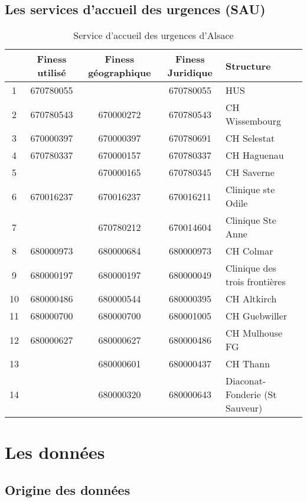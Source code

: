 \documentclass[12pt,english,french]{report}
\begin{document}
\section{Les services d'accueil des urgences (SAU)}

\begin{table}
\begin{center}
\begin{tabular}{|c|c|c|c|l|}
  \hline
& Finess utilisé & Finess géographique & Finess Juridique & Structure \\
  \hline
  \hline
1 & 670780055 &   & 670780055 & HUS \\
2 & 670780543 & 670000272 & 670780543 & CH Wissembourg \\
3 & 670000397 & 670000397  & 670780691 & CH Selestat \\
4 & 670780337 & 670000157 & 670780337 & CH Haguenau \\
5 &   & 670000165 & 670780345 & CH Saverne \\
6 & 670016237  & 670016237  & 670016211 & Clinique ste Odile \\
7 &   & 670780212 & 670014604 & Clinique Ste Anne \\
8 & 680000973 & 680000684 & 680000973 & CH Colmar \\
9 & 680000197  & 680000197  & 680000049 & Clinique des trois frontières \\
10 & 680000486 & 680000544  & 680000395 & CH Altkirch \\
11 & 680000700 & 680000700 & 680001005 & CH Guebwiller \\
12 & 680000627 & 680000627 & 680000486 & CH Mulhouse FG \\
13 &   & 680000601 & 680000437 & CH Thann \\
14 &   & 680000320  & 680000643 & Diaconat-Fonderie (St Sauveur) \\
\hline
\end{tabular}
\caption{Service d'accueil des urgences d'Alsace}
\label{summary}
\end{center}
\end{table}

%
%
\chapter{Les données}

\section{Origine des données}
\end{document}
